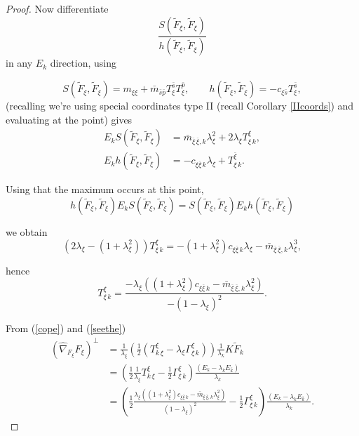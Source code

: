 \documentclass[12pt,letterpaper]{amsart}%
\numberwithin{mycounter}{section}
\theoremstyle{plain}
\numberwithin{equation}{section}
\theoremstyle{definition}
\newcommand{\maxidx}{\mathord{\xi}} %
\begin{document}
\begin{proof}
Now differentiate
\[
\frac{S(\widetilde{F}_{\maxidx},\widetilde{F}_{\maxidx})}
{h(\widetilde{F}_{\maxidx},\widetilde{F}_{\maxidx})}
\]
in any $E_{k}$ direction, using 

\[
S(\widetilde{F}_{\maxidx},\widetilde{F}_{\maxidx})
=m_{\maxidx\maxidx}
+\bar{m}_{\bar{s}\bar{p}}T_{\maxidx}^{\bar{s}}T_{\maxidx}^{\bar{p}},
\qquad
h(\widetilde{F}_{\maxidx},\widetilde{F}_{\maxidx})
=-c_{\maxidx\bar{s}} T_{\maxidx}^{\bar{s}},
\]
(recalling we're using special coordinates type II (recall Corollary \ref{IIcoords})  and evaluating at the point) gives
\begin{align*}
E_{k}S(\widetilde{F}_{\maxidx},\widetilde{F}_{\maxidx})
 &=\bar{m}_{\overline{\maxidx}\,\overline{\maxidx},k}\lambda_{\maxidx}^{2}+2 \lambda_{\maxidx}T_{\maxidx\,k}^{\maxidx},\\
E_{k}h(\widetilde{F}_{\maxidx},\widetilde{F}_{\maxidx})
 &=-c_{\maxidx\overline{\maxidx}\,k}\lambda_{\maxidx}+T_{\maxidx\,k}^{\bar{\maxidx}}.
\end{align*}

Using that the maximum occurs at this point,
\[
h(\widetilde{F}_{\maxidx},\widetilde{F}_{\maxidx})
E_{k}S(\widetilde{F}_{\maxidx},\widetilde{F}_{\maxidx})
=
S(\widetilde{F}_{\maxidx},\widetilde{F}_{\maxidx})
E_{k}h(\widetilde{F}_{\maxidx},\widetilde{F}_{\maxidx})
\]

we obtain
\[
\left(  2\lambda_{\maxidx}-(1+\lambda^2_{\maxidx})\right)  T_{\maxidx\,k}^{\maxidx}
=
-(1+\lambda^2_{\maxidx})c_{\maxidx\overline{\maxidx}\,k}\lambda_{\maxidx}
-\bar{m}_{\overline{\maxidx}\,\overline{\maxidx},k}\lambda_{\maxidx}^{3},
\]

hence
\[
T_{\maxidx\,k}^{\maxidx}
=
\frac{-\lambda_{\maxidx}\left(
(1+\lambda^2_{\maxidx})c_{\maxidx\overline{\maxidx}\,k}-\bar{m}_{\overline{\maxidx}\,\overline{\maxidx},k}\lambda_{\maxidx}^{2}
\right)}
{-(1-\lambda_{\maxidx})^2}.
\]

From (\ref{cope}) and (\ref{seethe}) 
\begin{align*}
\left(  \hat{\nabla}_{F_{\maxidx}}F_{\maxidx}\right)  ^{\perp}
&=\frac{1}{\lambda_{\maxidx}}
  \left(  \frac{1}{2}(T_{k\,\maxidx}^{\maxidx}-\lambda_{\maxidx}\Gamma_{\maxidx\,k}^{\maxidx})\right)
  \frac{1}{\lambda_{k}}K\widetilde{F}_{k}\\
&=\left(
  \frac{1}{2}\frac{1}{\lambda_{\maxidx}}T_{k\,\maxidx}^{\maxidx}
  -\frac{1}{2}\Gamma_{\maxidx\,k}^{\maxidx}
 \right)
 \frac{(E_{k}-\lambda_{k}E_{\bar{k}})}{\lambda_{k}}\\
&=\left(
  \frac{1}{2}
   \frac{\lambda_{\maxidx}\left(
(1+\lambda^2_{\maxidx})c_{\maxidx\overline{\maxidx}\,k}-\bar{m}_{\overline{\maxidx}\,\overline{\maxidx},k}\lambda_{\maxidx}^{2}
\right)}
{(1-\lambda_{\maxidx})^2}
  -\frac{1}{2}\Gamma_{\maxidx\,k}^{\maxidx}
 \right)
 \frac{(E_{k}-\lambda_{k}E_{\bar{k}})}{\lambda_{k}}.
\end{align*}


\end{proof}
\end{document}

